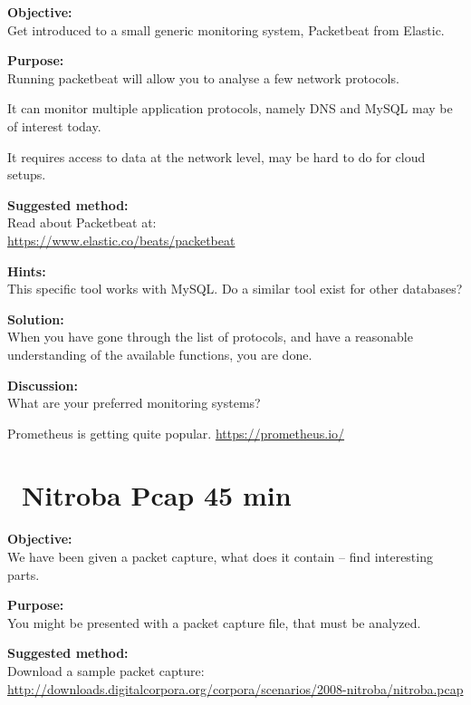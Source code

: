 \documentclass[a4paper,11pt,notitlepage]{report}
\begin{document}

{\bf Objective:}\\
Get introduced to a small generic monitoring system, Packetbeat from Elastic.


{\bf Purpose:}\\
Running packetbeat will allow you to analyse a few network protocols.

It can monitor multiple application protocols, namely DNS and MySQL may be of interest today.

It requires access to data at the network level, may be hard to do for cloud setups.

{\bf Suggested method:}\\
Read about Packetbeat at:\\
\url{https://www.elastic.co/beats/packetbeat}

{\bf Hints:}\\
This specific tool works with MySQL. Do a similar tool exist for other databases?


{\bf Solution:}\\
When you have gone through the list of protocols, and have a reasonable understanding of the available functions, you are done.

{\bf Discussion:}\\
What are your preferred monitoring systems?

Prometheus is getting quite popular.
\url{https://prometheus.io/}





\chapter{\faExclamationTriangle\ Nitroba Pcap 45 min}
\label{ex:nitroba-pcap}


{\bf Objective:}\\
We have been given a packet capture, what does it contain -- find interesting parts.

{\bf Purpose:}\\
You might be presented with a packet capture file, that must be analyzed.

{\bf Suggested method:}\\
Download a sample packet capture:\\
\url{http://downloads.digitalcorpora.org/corpora/scenarios/2008-nitroba/nitroba.pcap}
\end{document}
